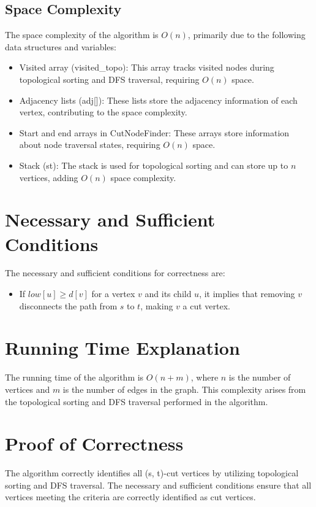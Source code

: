 \documentclass{article}
\begin{document}
    \subsection{Space Complexity}
        The space complexity of the algorithm is $O(n)$, primarily due to the following data structures and variables:
        \begin{itemize}
            \item Visited array (visited\_topo): This array tracks visited nodes during topological sorting and DFS traversal, requiring $O(n)$ space.
            \item Adjacency lists (adj[]): These lists store the adjacency information of each vertex, contributing to the space complexity.
            \item Start and end arrays in CutNodeFinder: These arrays store information about node traversal states, requiring $O(n)$ space.
            \item Stack (st): The stack is used for topological sorting and can store up to $n$ vertices, adding $O(n)$ space complexity.
        \end{itemize}


\section{Necessary and Sufficient Conditions}
    The necessary and sufficient conditions for correctness are:
    \begin{itemize}
        \item If $low[u] \geq d[v]$ for a vertex $v$ and its child $u$, it implies that removing $v$ disconnects the path from $s$ to $t$, making $v$ a cut vertex.
    \end{itemize}


\section{Running Time Explanation}
    The running time of the algorithm is $O(n + m)$, where $n$ is the number of vertices and $m$ is the number of edges in the graph. This complexity arises from the topological sorting and DFS traversal performed in the algorithm.


\section{Proof of Correctness}
    The algorithm correctly identifies all (s, t)-cut vertices by utilizing topological sorting and DFS traversal. The necessary and sufficient conditions ensure that all vertices meeting the criteria are correctly identified as cut vertices.
\end{document}
